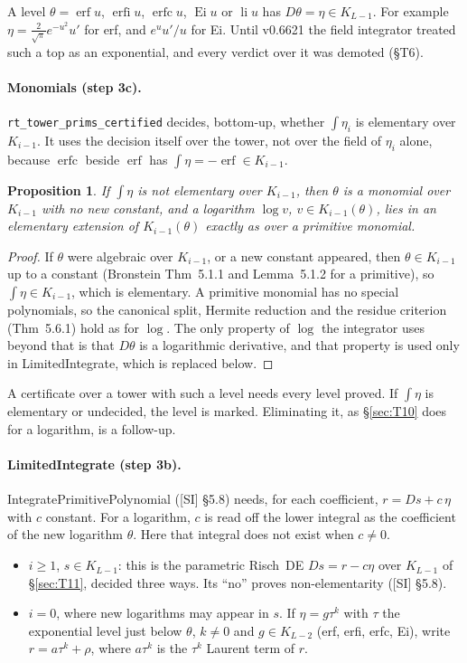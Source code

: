 \documentclass[11pt]{article}
\newtheorem{proposition}[theorem]{Proposition}
\theoremstyle{definition}
\theoremstyle{remark}
\newcommand{\code}[1]{\texttt{#1}}
\begin{document}
A level $\theta=\operatorname{erf}u$, $\operatorname{erfi}u$, $\operatorname{erfc}u$,
$\operatorname{Ei}u$ or $\operatorname{li}u$ has $D\theta=\eta\in K_{L-1}$. For
example $\eta=\tfrac2{\sqrt\pi}e^{-u^2}u'$ for erf, and $e^uu'/u$ for Ei. Until
v0.6621 the field integrator treated such a top as an exponential, and every verdict over
it was demoted (\S T6).

\paragraph{Monomials (step 3c).} \code{rt\_tower\_prims\_certified} decides, bottom-up,
whether $\int\eta_i$ is elementary over $K_{i-1}$. It uses the decision itself over the
tower, not over the field of $\eta_i$ alone, because $\operatorname{erfc}$ beside
$\operatorname{erf}$ has $\int\eta=-\operatorname{erf}\in K_{i-1}$.

\begin{proposition}\label{prop:T12a}
If $\int\eta$ is not elementary over $K_{i-1}$, then $\theta$ is a monomial over
$K_{i-1}$ with no new constant, and a logarithm $\log v$, $v\in K_{i-1}(\theta)$, lies in
an elementary extension of $K_{i-1}(\theta)$ exactly as over a primitive monomial.
\end{proposition}
\begin{proof}
If $\theta$ were algebraic over $K_{i-1}$, or a new constant appeared, then
$\theta\in K_{i-1}$ up to a constant (Bronstein Thm~5.1.1 and Lemma~5.1.2 for a
primitive), so $\int\eta\in K_{i-1}$, which is elementary. A primitive monomial has no
special polynomials, so the canonical split, Hermite reduction and the residue criterion
(Thm~5.6.1) hold as for $\log$. The only property of $\log$ the integrator uses beyond
that is that $D\theta$ is a logarithmic derivative, and that property is used only in
LimitedIntegrate, which is replaced below.
\end{proof}
A certificate over a tower with such a level needs every level proved. If $\int\eta$ is
elementary or undecided, the level is marked. Eliminating it, as \S\ref{sec:T10} does for
a logarithm, is a follow-up.

\paragraph{LimitedIntegrate (step 3b).} IntegratePrimitivePolynomial ([SI] \S5.8)
needs, for each coefficient, $r=Ds+c\,\eta$ with $c$ constant. For a logarithm, $c$ is
read off the lower integral as the coefficient of the new logarithm $\theta$. Here that
integral does not exist when $c\ne0$.
\begin{itemize}
\item $i\ge1$, $s\in K_{L-1}$: this is the parametric Risch~DE $Ds=r-c\eta$ over
  $K_{L-1}$ of \S\ref{sec:T11}, decided three ways. Its ``no'' proves non-elementarity
  ([SI] \S5.8).
\item $i=0$, where new logarithms may appear in $s$. If $\eta=g\tau^k$ with $\tau$ the
  exponential level just below $\theta$, $k\ne0$ and $g\in K_{L-2}$ (erf, erfi, erfc,
  Ei), write $r=a\tau^k+\rho$, where $a\tau^k$ is the $\tau^k$ Laurent term of $r$.
\end{itemize}
\end{document}
